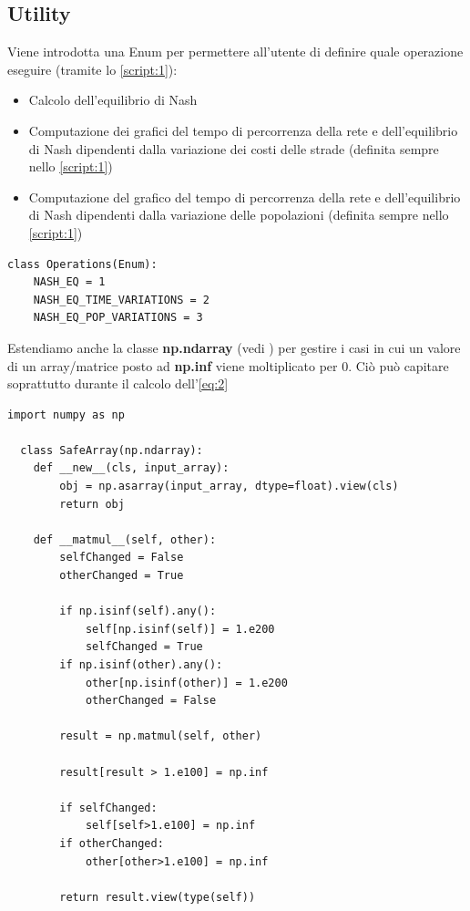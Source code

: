 \subsection{Utility}
\label{subsec:Utility}

Viene introdotta una Enum per permettere all'utente di definire quale operazione eseguire (tramite lo \autoref{script:1}):
\begin{itemize}
    \item Calcolo dell'equilibrio di Nash
    \item Computazione dei grafici del tempo di percorrenza della rete e dell'equilibrio di Nash dipendenti dalla variazione dei costi delle strade (definita sempre nello \autoref{script:1})
    \item Computazione del grafico del tempo di percorrenza della rete e dell'equilibrio di Nash dipendenti dalla variazione delle popolazioni (definita sempre nello \autoref{script:1})
\end{itemize}
\begin{lstlisting}[style=myStile, caption={Operations}, label={script:2}]
  class Operations(Enum):
    NASH_EQ = 1
    NASH_EQ_TIME_VARIATIONS = 2
    NASH_EQ_POP_VARIATIONS = 3
\end{lstlisting}

Estendiamo anche la classe \textbf{np.ndarray} (vedi \cite{numpy_docs}) per gestire i casi in cui un valore di un array/matrice posto ad \textbf{np.inf} viene moltiplicato per 0.
Ciò può capitare soprattutto durante il calcolo dell'\autoref{eq:2}

\begin{lstlisting}[style=myStile, caption={SafeArray}, label={script:3}]
  import numpy as np

  class SafeArray(np.ndarray):
    def __new__(cls, input_array):
        obj = np.asarray(input_array, dtype=float).view(cls)
        return obj
    
    def __matmul__(self, other):
        selfChanged = False
        otherChanged = True        
        
        if np.isinf(self).any():
            self[np.isinf(self)] = 1.e200
            selfChanged = True
        if np.isinf(other).any():
            other[np.isinf(other)] = 1.e200
            otherChanged = False
            
        result = np.matmul(self, other)
        
        result[result > 1.e100] = np.inf
        
        if selfChanged:
            self[self>1.e100] = np.inf
        if otherChanged:
            other[other>1.e100] = np.inf

        return result.view(type(self))
\end{lstlisting}


